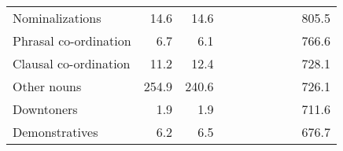 \begin{table}[!t]
\begin{tabular*}{\linewidth}{@{\extracolsep{\fill}}lrrrrrrrrr}
Nominalizations & 14.6 & 14.6 & {\cellcolor[HTML]{4393C3}{\textcolor[HTML]{FFFFFF}{209\%}}} & {\cellcolor[HTML]{4393C3}{\textcolor[HTML]{FFFFFF}{214\%}}} & {\cellcolor[HTML]{92C5DE}{\textcolor[HTML]{000000}{145\%}}} & {\cellcolor[HTML]{92C5DE}{\textcolor[HTML]{000000}{151\%}}} & {\cellcolor[HTML]{FDDBC7}{\textcolor[HTML]{000000}{88\%}}} & {\cellcolor[HTML]{F7F7F7}{\textcolor[HTML]{000000}{91\%}}} & 805.5 \\ 
Phrasal co-ordination & 6.7 & 6.1 & {\cellcolor[HTML]{92C5DE}{\textcolor[HTML]{000000}{144\%}}} & {\cellcolor[HTML]{92C5DE}{\textcolor[HTML]{000000}{194\%}}} & {\cellcolor[HTML]{92C5DE}{\textcolor[HTML]{000000}{187\%}}} & {\cellcolor[HTML]{92C5DE}{\textcolor[HTML]{000000}{170\%}}} & {\cellcolor[HTML]{F7F7F7}{\textcolor[HTML]{000000}{92\%}}} & {\cellcolor[HTML]{F7F7F7}{\textcolor[HTML]{000000}{97\%}}} & 766.6 \\ 
Clausal co-ordination & 11.2 & 12.4 & {\cellcolor[HTML]{F4A582}{\textcolor[HTML]{000000}{63\%}}} & {\cellcolor[HTML]{F4A582}{\textcolor[HTML]{000000}{59\%}}} & {\cellcolor[HTML]{92C5DE}{\textcolor[HTML]{000000}{141\%}}} & {\cellcolor[HTML]{D1E5F0}{\textcolor[HTML]{000000}{127\%}}} & {\cellcolor[HTML]{D1E5F0}{\textcolor[HTML]{000000}{120\%}}} & {\cellcolor[HTML]{D1E5F0}{\textcolor[HTML]{000000}{116\%}}} & 728.1 \\ 
Other nouns & 254.9 & 240.6 & {\cellcolor[HTML]{F7F7F7}{\textcolor[HTML]{000000}{97\%}}} & {\cellcolor[HTML]{F7F7F7}{\textcolor[HTML]{000000}{103\%}}} & {\cellcolor[HTML]{F7F7F7}{\textcolor[HTML]{000000}{91\%}}} & {\cellcolor[HTML]{F7F7F7}{\textcolor[HTML]{000000}{95\%}}} & {\cellcolor[HTML]{F7F7F7}{\textcolor[HTML]{000000}{91\%}}} & {\cellcolor[HTML]{F7F7F7}{\textcolor[HTML]{000000}{94\%}}} & 726.1 \\ 
Downtoners & 1.9 & 1.9 & {\cellcolor[HTML]{92C5DE}{\textcolor[HTML]{000000}{155\%}}} & {\cellcolor[HTML]{D1E5F0}{\textcolor[HTML]{000000}{118\%}}} & {\cellcolor[HTML]{F4A582}{\textcolor[HTML]{000000}{60\%}}} & {\cellcolor[HTML]{F4A582}{\textcolor[HTML]{000000}{57\%}}} & {\cellcolor[HTML]{F4A582}{\textcolor[HTML]{000000}{68\%}}} & {\cellcolor[HTML]{F4A582}{\textcolor[HTML]{000000}{73\%}}} & 711.6 \\ 
Demonstratives & 6.2 & 6.5 & {\cellcolor[HTML]{92C5DE}{\textcolor[HTML]{000000}{137\%}}} & {\cellcolor[HTML]{D1E5F0}{\textcolor[HTML]{000000}{133\%}}} & {\cellcolor[HTML]{FDDBC7}{\textcolor[HTML]{000000}{77\%}}} & {\cellcolor[HTML]{FDDBC7}{\textcolor[HTML]{000000}{80\%}}} & {\cellcolor[HTML]{FDDBC7}{\textcolor[HTML]{000000}{75\%}}} & {\cellcolor[HTML]{FDDBC7}{\textcolor[HTML]{000000}{80\%}}} & 676.7 \\ 

\end{tabular*}
\end{table}
